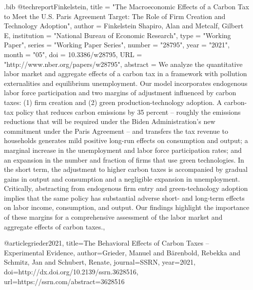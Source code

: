 \begin{filecontents}{.bib}
@techreport{Finkelstein,
 title = "The Macroeconomic Effects of a Carbon Tax to Meet the U.S. Paris Agreement Target: The Role of Firm Creation and Technology Adoption",
 author = {{Finkelstein Shapiro, Alan and Metcalf, Gilbert E}},
 institution = "National Bureau of Economic Research",
 type = "Working Paper",
 series = "Working Paper Series",
 number = "28795",
 year = "2021",
 month = "05",
 doi = {10.3386/w28795},
 URL = "http://www.nber.org/papers/w28795",
 abstract = {We analyze the quantitative labor market and aggregate effects of a carbon tax in a framework with pollution externalities and equilibrium unemployment. Our model incorporates endogenous labor force participation and two margins of adjustment influenced by carbon taxes: (1) firm creation and (2) green production-technology adoption.  A carbon-tax policy that reduces carbon emissions by 35 percent – roughly the emissions reductions that will be required under the Biden Administration's new commitment under the Paris Agreement – and transfers the tax revenue to households generates mild positive long-run effects on consumption and output; a marginal increase in the unemployment and labor force participation rates; and an expansion in the number and fraction of firms that use green technologies. In the short term, the adjustment to higher carbon taxes is accompanied by gradual gains in output and consumption and a negligible expansion in unemployment. Critically, abstracting from endogenous firm entry and green-technology adoption implies that the same policy has substantial adverse short- and long-term effects on labor income, consumption, and output. Our findings highlight the importance of these margins for a comprehensive assessment of the labor market and aggregate effects of carbon taxes.},
}


@article{grieder2021,
  title={The Behavioral Effects of Carbon Taxes – Experimental Evidence},
  author={{Grieder, Manuel and Bärenbold, Rebekka and Schmitz, Jan and Schubert, Renate}},
 journal={SSRN},
  year={2021},
  doi={http://dx.doi.org/10.2139/ssrn.3628516},
  url={https://ssrn.com/abstract=3628516 }
}






\end{filecontents}
